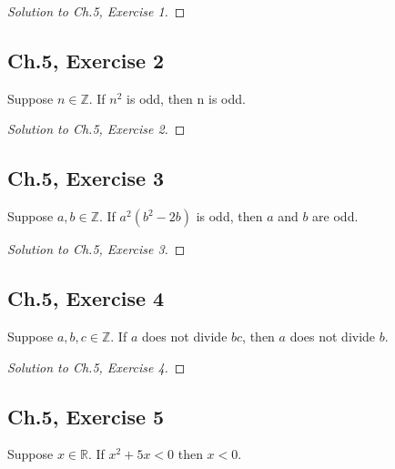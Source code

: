 \documentclass[12pt]{amsart}
\numberwithin{equation}{section}
\theoremstyle{definition}
\theoremstyle{remark}
\begin{document}
\begin{proof}[Solution to Ch.5,  Exercise 1]

\end{proof}




\subsection*{Ch.5,  Exercise 2}  Suppose $ n \in \mathbb{Z} $. If $ n^2 $ is odd, then n is odd.  


\begin{proof}[Solution to Ch.5,  Exercise 2]

\end{proof}




\subsection*{Ch.5,  Exercise 3}  Suppose $ a,b \in \mathbb{Z} $. If $ a^2(b^2-2b) $ is odd, then $ a $ and $ b $ are odd.



\begin{proof}[Solution to Ch.5,  Exercise 3]

\end{proof}




\subsection*{Ch.5,  Exercise 4}  Suppose $ a,b,c \in \mathbb{Z} $. If $ a $ does not divide $ bc $, then $ a $ does not divide $ b $.



\begin{proof}[Solution to Ch.5,  Exercise 4]

\end{proof}





\subsection*{Ch.5,  Exercise 5}  Suppose $ x \in \mathbb{R} $. If $ x^2 + 5x < 0 $ then $ x < 0 $.
\end{document}
